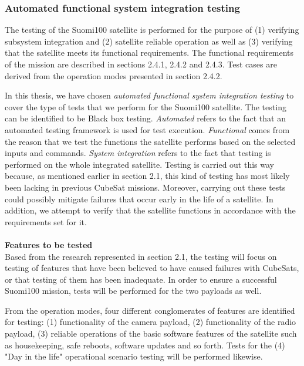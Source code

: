 \documentclass[english,12pt,a4paper,pdftex,elec,utf8]{aaltothesis}
\begin{document}
\subsubsection{Automated functional system integration testing}
The testing of the Suomi100 satellite is performed for the purpose of (1) verifying subsystem integration and (2) satellite reliable operation as well as (3) verifying that the satellite meets its functional requirements. The functional requirements of the mission are described in 
sections 2.4.1, 2.4.2 and 2.4.3. Test cases are derived from the operation modes presented in section 2.4.2.\par 
In this thesis, we have chosen \textit{automated functional system integration testing} to cover the type of tests that we perform for the Suomi100 satellite. The testing can be identified to be Black box testing. \textit{Automated} refers to the fact that an automated testing framework is used for test execution. \textit{Functional} comes from the reason that we test the functions the satellite performs based on the selected inputs and commands. \textit{System integration} refers to the fact that testing is performed on the whole integrated satellite. Testing is carried out this way because, as mentioned earlier in section 2.1, this kind of testing has most likely been lacking in previous CubeSat missions. Moreover,  carrying out these tests could possibly mitigate failures that occur early in the life of a satellite. In addition, we attempt to verify that the satellite functions in accordance with the requirements set for it.
\\
\\
\textbf{Features to be tested} 
\\
Based from the research represented in section 2.1, the testing will focus on testing of features that have been believed to have caused failures with CubeSats, or that testing of them has been inadequate. In order to ensure a successful Suomi100 mission, tests will be performed for the two payloads as well.\par
From the operation modes, four different conglomerates of features are identified for testing: (1) functionality of the camera payload, (2) functionality of the radio payload, (3) reliable operations of the basic software features of the satellite such as housekeeping, safe reboots, software updates and so forth. Tests for the (4) "Day in the life" operational scenario testing will be performed likewise.
\\
\end{document}
